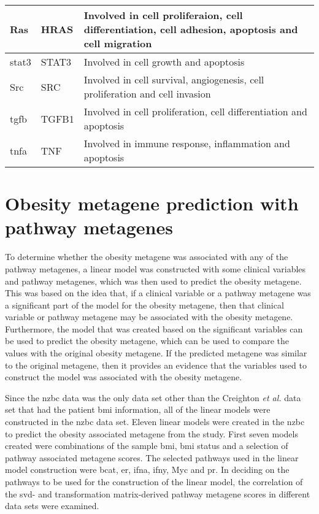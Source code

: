 \begin{longtable}{llp{8cm}}
	\hline
	\rule{0pt}{2.25ex}Ras         & HRAS   & Involved in cell proliferaion, cell differentiation, cell adhesion, apoptosis and cell migration\\
	\hline
	\rule{0pt}{2.25ex}\Gls{stat3} & STAT3  & Involved in cell growth and apoptosis\\
	\hline
	\rule{0pt}{2.25ex}Src         & SRC    & Involved in cell survival, angiogenesis, cell proliferation and cell invasion\\
	\hline
	\rule{0pt}{2.25ex}\Gls{tgfb}  & TGFB1  & Involved in cell proliferation, cell differentiation and apoptosis\\
	\hline
	\rule{0pt}{2.25ex}\Gls{tnfa}  & TNF    & Involved in immune response, inflammation and apoptosis\\
\end{longtable}

\section{Obesity metagene prediction with pathway metagenes}
\label{sec:obesity_metagene_prediction_with_pathway_metagenes}

To determine whether the obesity metagene was associated with any of the pathway metagenes, a linear model was constructed with some clinical variables and pathway metagenes, which was then used to predict the obesity metagene.
This was based on the idea that, if a clinical variable or a pathway metagene was a significant part of the model for the obesity metagene, then that clinical variable or pathway metagene may be associated with the obesity metagene.
Furthermore, the model that was created based on the significant variables can be used to predict the obesity metagene, which can be used to compare the values with the original obesity metagene.
If the predicted metagene was similar to the original metagene, then it provides an evidence that the variables used to construct the model was associated with the obesity metagene.

Since the \gls{nzbc} data was the only data set other than the Creighton \textit{et al.} data set that had the patient \gls{bmi} information, all of the linear models were constructed in the \gls{nzbc} data set.
Eleven linear models were created in the \gls{nzbc} to predict the obesity associated metagene from the \citet{Creighton2012} study.
First seven models created were combinations of the sample \gls{bmi}, \gls{bmi} status and a selection of pathway associated metagene scores.
The selected pathways used in the linear model construction were \gls{bcat}, \gls{er}, \gls{ifna}, \gls{ifny}, Myc and \gls{pr}.
In deciding on the pathways to be used for the construction of the linear model, the correlation of the \gls{svd}- and transformation matrix-derived pathway metagene scores in different data sets were examined.


